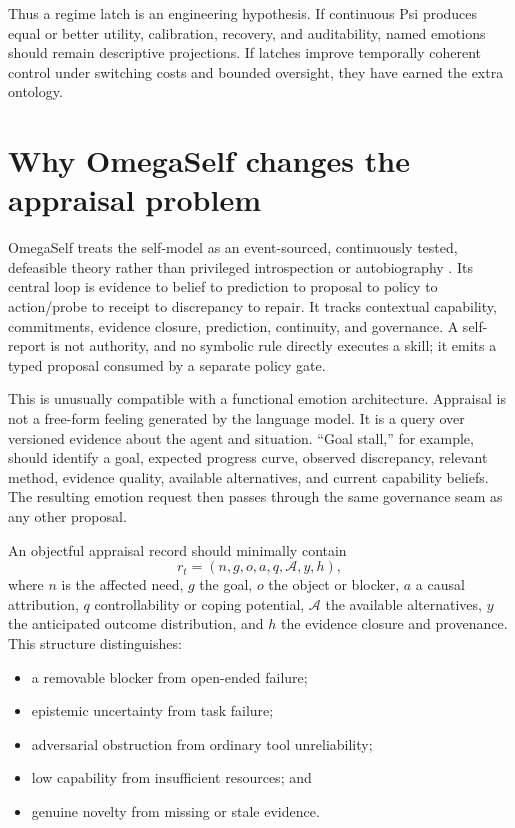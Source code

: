 \documentclass[11pt]{article}
\begin{document}
Thus a regime latch is an engineering hypothesis.  If continuous Psi produces
equal or better utility, calibration, recovery, and auditability, named emotions
should remain descriptive projections.  If latches improve temporally coherent
control under switching costs and bounded oversight, they have earned the extra
ontology.

\section{Why OmegaSelf changes the appraisal problem}

OmegaSelf treats the self-model as an event-sourced, continuously tested,
defeasible theory rather than privileged introspection or autobiography
\cite{omegaself2026}.  Its central loop is evidence to belief to prediction to
proposal to policy to action/probe to receipt to discrepancy to repair.  It
tracks contextual capability, commitments, evidence closure, prediction,
continuity, and governance.  A self-report is not authority, and no symbolic
rule directly executes a skill; it emits a typed proposal consumed by a separate
policy gate.

This is unusually compatible with a functional emotion architecture.  Appraisal
is not a free-form feeling generated by the language model.  It is a query over
versioned evidence about the agent and situation.  ``Goal stall,'' for example,
should identify a goal, expected progress curve, observed discrepancy, relevant
method, evidence quality, available alternatives, and current capability beliefs.
The resulting emotion request then passes through the same governance seam as
any other proposal.

An objectful appraisal record should minimally contain
\begin{equation}
r_t=(n,g,o,a,q,\mathcal{A},y,h),
\end{equation}
where $n$ is the affected need, $g$ the goal, $o$ the object or blocker, $a$ a
causal attribution, $q$ controllability or coping potential, $\mathcal{A}$ the
available alternatives, $y$ the anticipated outcome distribution, and $h$ the
evidence closure and provenance.  This structure distinguishes:
\begin{itemize}[leftmargin=*]
  \item a removable blocker from open-ended failure;
  \item epistemic uncertainty from task failure;
  \item adversarial obstruction from ordinary tool unreliability;
  \item low capability from insufficient resources; and
  \item genuine novelty from missing or stale evidence.
\end{itemize}
\end{document}
